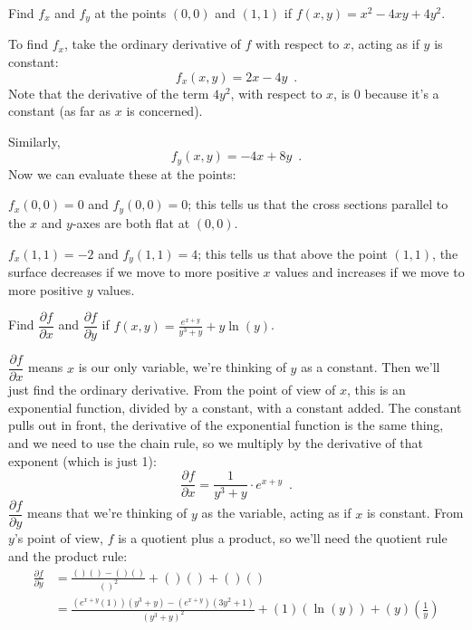 \begin{example}
Find $f_x$ and $f_y$ at the points $(0, 0)$ and $(1, 1)$ if $f(x,y)=x^2-4xy+4y^2$.

\begin{solution}
  To find $f_x$, take the ordinary derivative of $f$ with respect to $x$, acting as if $y$ is constant:
$$f_x(x,y)=2x-4y \enspace .$$
Note that the derivative of the term $4y^2$, with respect to $x$, is $0$ because it's a constant (as far as $x$ is concerned).

Similarly,
$$f_y(x,y)=-4x+8y \enspace .$$
Now we can evaluate these at the points:

$f_x(0,0)=0$ and $f_y(0,0)=0$; this tells us that the cross sections parallel to the $x$ and $y$-axes are both flat at $(0,0)$.

$f_x(1,1)=-2$ and $f_y(1,1)=4$; this tells us that above the point $(1, 1)$, the surface decreases if we move to more positive $x$ values and increases if we move to more positive $y$ values.
\end{solution}\end{example}

\begin{example}
Find $\dfrac{\partial f}{\partial x}$ and $\dfrac{\partial f}{\partial y}$ if $f(x,y)=\frac{e^{x+y}}{y^3+y} + y\ln(y)$.

\begin{solution}
  $\dfrac{\partial f}{\partial x}$ means $x$ is our only variable, we're thinking of $y$ as a constant. Then we'll just find the ordinary derivative. From the point of view of $x$, this is an exponential function, divided by a constant, with a constant added. The constant pulls out in front, the derivative of the exponential function is the same thing, and we need to use the chain rule, so we multiply by the derivative of that exponent (which is just 1):
$$\frac{\partial f}{\partial x} = \frac{1}{y^3+y}\cdot e^{x+y} \enspace .$$
$\dfrac{\partial f}{\partial y}$ means that we're thinking of $y$ as the variable, acting as if $x$ is constant. From $y$'s point of view, $f$ is a quotient plus a product, so we'll need the quotient rule and the product rule:
\begin{align*}
\frac{\partial f}{\partial y} &= \frac{( )( )-( )( )}{( )^2}+( )( )+( )( ) \\
 &= \frac{\left(e^{x+y}(1)\right)(y^3+y)-\left(e^{x+y}\right)(3y^2+1)}{(y^3+y)^2}+(1)(\ln(y))+(y)\left(\frac{1}{y}\right)
\end{align*}
\end{solution}\end{example}

